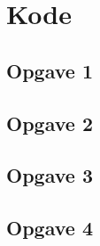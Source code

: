 \chapter{Kode}
\section{Opgave 1}


\clearpage
\section{Opgave 2}





\clearpage
\section{Opgave 3}



\clearpage
\section{Opgave 4}

